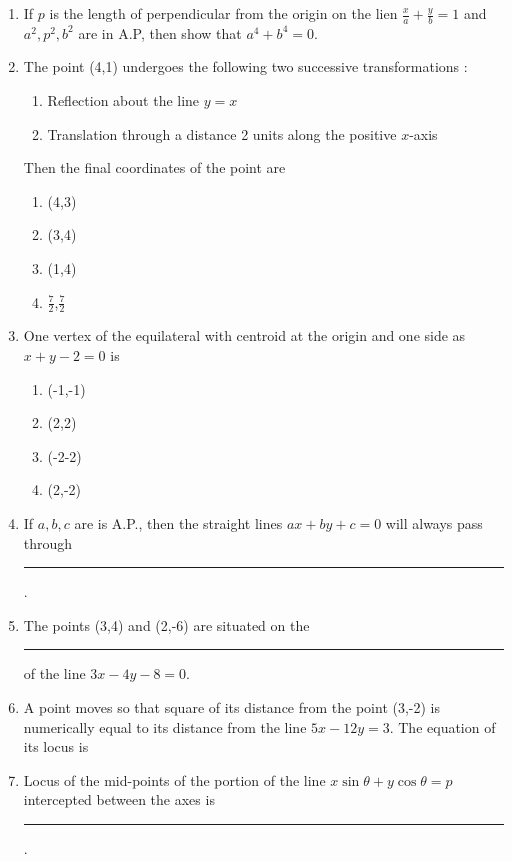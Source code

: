 \begin{enumerate}[label=\thesubsection.\arabic*,ref=\thesubsection.\theenumi]
\item If $p$ is the length of perpendicular from the origin on the lien $\frac{x}{a}+\frac{y}{b}=1$ and $a^2,p^2,b^2$ are in A.P, then show that $a^4+b^4=0$.
\item The point (4,1) undergoes the following two successive transformations :
\begin{enumerate}
\item Reflection about the line $y=x$
\item Translation through a distance 2 units along the positive $x$-axis 
\end{enumerate}
Then the final coordinates of the point are
\begin{enumerate}
\item (4,3)
\item (3,4)
\item (1,4)
\item $\frac{7}{2}$,$\frac{7}{2}$
\end{enumerate}
\item One vertex of the equilateral with centroid at the origin and one side as $x+y-2=0$ is
\begin{enumerate}
\item (-1,-1)
\item (2,2)
\item (-2-2)
\item (2,-2)
\end{enumerate}
\item If $a,b,c$ are is A.P., then the straight lines $ax+by+c=0$ will always pass through \rule{1cm}{0.15mm}.
\item The points (3,4) and (2,-6) are situated on the \rule{1cm}{0.15mm} of the line $3x-4y-8=0$.
\item A point moves so that square of its distance from the point (3,-2) is numerically equal to its distance from the line $5x-12y=3$. The equation of its locus is %
\item Locus of the mid-points of the portion of the line $x\sin\theta+y\cos\theta=p$ intercepted between the axes is \rule{1cm}{0.15mm}.


\end{enumerate}
